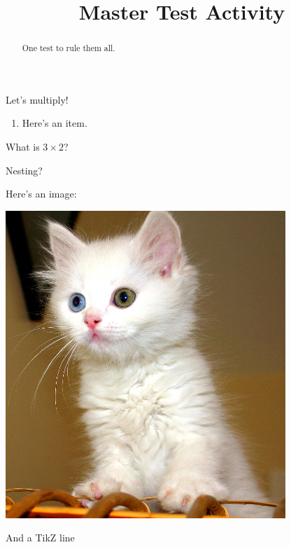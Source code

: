 \documentclass{ximera}
\title{Master Test Activity}
\begin{document}
\begin{abstract}
  One test to rule them all.
\end{abstract}

Let's multiply!

\begin{enumerate}[align=left]
	\item Here's an item.
\end{enumerate}

\begin{question}
	What is $3 \times 2$?  
	\begin{question}
		Nesting? 
	\end{question}
\end{question}

Here's an image:
\begin{image}
	\includegraphics{testCat.jpg}
\end{image}
And a TikZ line
\begin{image}
\end{image}
\end{document}
